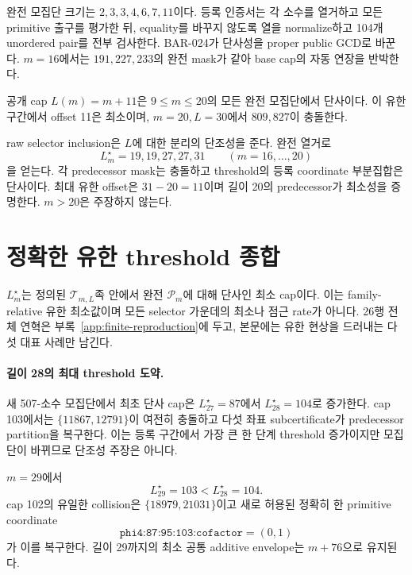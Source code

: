 \documentclass[11pt]{article}
\begin{document}
\begin{claimproof}
완전 모집단 크기는 \(2,3,3,4,6,7,11\)이다. 등록 인증서는 각 소수를
열거하고 모든 primitive 출구를 평가한 뒤, equality를 바꾸지 않도록
열을 normalize하고 104개 unordered pair를 전부 검사한다. BAR-024가
단사성을 proper public GCD로 바꾼다. \(m=16\)에서는
\(191,227,233\)의 완전 mask가 같아 base cap의 자동 연장을 반박한다.
\end{claimproof}

{}
공개 cap \(L(m)=m+11\)은
\(9\le m\le20\)의 모든 완전 모집단에서 단사이다. 이 유한 구간에서
offset 11은 최소이며, \(m=20,L=30\)에서 \(809,827\)이 충돌한다.

\begin{claimproof}
raw selector inclusion은 \(L\)에 대한 분리의 단조성을 준다. 완전 열거로
\[
L_m^\star=19,19,27,27,31\qquad(m=16,\ldots,20)
\]
을 얻는다. 각 predecessor mask는 충돌하고 threshold의 등록 coordinate
부분집합은 단사이다. 최대 유한 offset은 \(31-20=11\)이며 길이 20의
predecessor가 최소성을 증명한다. \(m>20\)은 주장하지 않는다.
\end{claimproof}

\section{정확한 유한 threshold 종합}

\(L_m^\star\)는 정의된 \(\mathcal T_{m,L}\)족 안에서 완전
\(\mathcal P_m\)에 대해 단사인 최소 cap이다. 이는 family-relative
유한 최소값이며 모든 selector 가운데의 최소나 점근 rate가 아니다.
26행 전체 연혁은 부록~\ref{app:finite-reproduction}에 두고,
본문에는 유한 현상을 드러내는 다섯 대표 사례만 남긴다.

\paragraph{길이 28의 최대 threshold 도약.}
새 507-소수 모집단에서 최초 단사 cap은 \(L_{27}^\star=87\)에서
\(L_{28}^\star=104\)로 증가한다. cap 103에서는
\(\{11867,12791\}\)이 여전히 충돌하고 다섯 좌표 subcertificate가
predecessor partition을 복구한다. 이는 등록 구간에서 가장 큰 한 단계
threshold 증가이지만 모집단이 바뀌므로 단조성 주장은 아니다.

{}
\(m=29\)에서
\[
L_{29}^\star=103<L_{28}^\star=104.
\]
cap 102의 유일한 collision은 \(\{18979,21031\}\)이고 새로 허용된 정확히
한 primitive coordinate
\[
\texttt{phi4:87:95:103:cofactor}=(0,1)
\]
가 이를 복구한다. 길이 29까지의 최소 공통 additive envelope는
\(m+76\)으로 유지된다.
\end{document}
